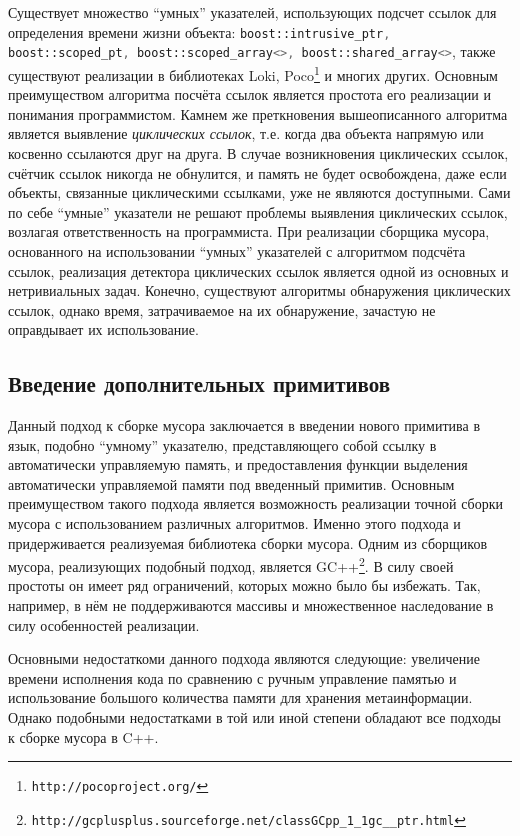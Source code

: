 Существует множество ``умных'' указателей, использующих подсчет ссылок для определения времени жизни объекта:
\lstinline[language= cpp]{boost::intrusive_ptr, boost::scoped_pt, boost::scoped_array<>, boost::shared_array<>},
также существуют реализации в библиотеках Loki\cite{Alexandrescu}, Poco\footnote{\texttt{http://pocoproject.org/}} и многих других.
Основным преимуществом алгоритма посчёта ссылок является простота его реализации и понимания программистом.
Камнем же преткновения вышеописанного алгоритма является выявление \textit{циклических ссылок}, т.е. когда два объекта
напрямую или косвенно ссылаются друг на друга. В случае возникновения циклических ссылок, счётчик ссылок никогда не обнулится,
и память не будет освобождена, даже если объекты, связанные циклическими ссылками, уже не являются доступными.
Сами по себе ``умные'' указатели не решают проблемы выявления циклических ссылок, возлагая ответственность на программиста.
При реализации сборщика мусора, основанного на использовании ``умных'' указателей с алгоритмом подсчёта ссылок,
реализация детектора циклических ссылок является одной из основных и нетривиальных задач.
Конечно, существуют алгоритмы обнаружения циклических ссылок, однако время, затрачиваемое на их обнаружение,
зачастую не оправдывает их использование.

\subsection{Введение дополнительных примитивов}
Данный подход к сборке мусора заключается в введении нового примитива в язык, подобно ``умному'' указателю,
представляющего собой ссылку в автоматически управляемую память, и предоставления функции выделения автоматически управляемой
памяти под введенный примитив.
Основным преимуществом такого подхода является возможность реализации точной сборки мусора с использованием различных алгоритмов.
Именно этого подхода и придерживается реализуемая библиотека сборки мусора.
Одним из сборщиков мусора, реализующих подобный подход, является GC++\footnote{\texttt{http://gcplusplus.sourceforge.net/classGCpp\_1\_1gc\_\_ptr.html}}. В силу своей простоты он имеет ряд ограничений, которых можно было бы избежать.
Так, например, в нём не поддерживаются массивы и множественное наследование в силу особенностей реализации.

Основными недостаткоми данного подхода являются следующие:
увеличение времени исполнения кода по сравнению с ручным управление памятью
и использование большого количества памяти для хранения метаинформации.
Однако подобными недостатками в той или иной степени обладают все подходы к сборке мусора в C++.

